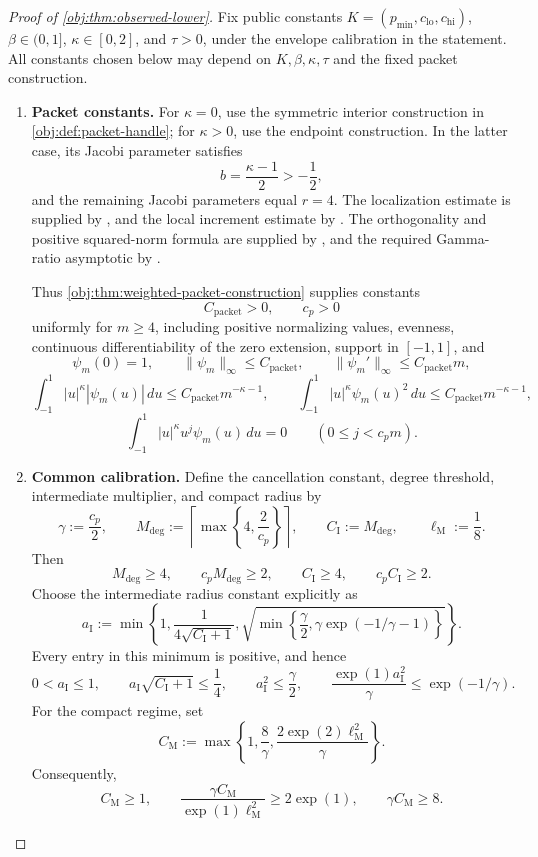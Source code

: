 \documentclass[11pt]{article}
\begin{document}
\begin{proof}[Proof of \cref{obj:thm:observed-lower}]
Fix public constants \(K=(p_{\min},c_{\mathrm{lo}},c_{\mathrm{hi}})\), \(\beta\in(0,1]\), \(\kappa\in[0,2]\), and \(\tau>0\), under the envelope calibration in the statement. All constants chosen below may depend on \(K,\beta,\kappa,\tau\) and the fixed packet construction.

\begin{enumerate}
\item \textbf{Packet constants.}
For \(\kappa=0\), use the symmetric interior construction in \cref{obj:def:packet-handle}; for \(\kappa>0\), use the endpoint construction. In the latter case, its Jacobi parameter satisfies
\[
b=\frac{\kappa-1}{2}>-\frac12,
\]
and the remaining Jacobi parameters equal \(r=4\). The localization estimate is supplied by \citep[Theorem 2.4, equation (2.14)]{PetrushevXu2005}, and the local increment estimate by \citep[Theorem 2.2, equation (2.4)]{https://people.math.sc.edu/pencho/Publications/kpx-06-28-06-web.pdf}. The orthogonality and positive squared-norm formula are supplied by \citep[Table 18.3.1, Jacobi row and caption]{https://dlmf.nist.gov/18.3}, and the required Gamma-ratio asymptotic by \citep[equation (5.11.12), restricted to the positive real axis]{https://dlmf.nist.gov/5.11.E12}.

Thus \cref{obj:thm:weighted-packet-construction} supplies constants
\[
C_{\mathrm{packet}}>0,\qquad c_p>0
\]
uniformly for \(m\ge4\), including positive normalizing values, evenness, continuous differentiability of the zero extension, support in \([-1,1]\), and
\[
\psi_m(0)=1,\qquad
\|\psi_m\|_\infty\le C_{\mathrm{packet}},\qquad
\|\psi_m'\|_\infty\le C_{\mathrm{packet}}m,
\]
\[
\int_{-1}^{1}|u|^\kappa|\psi_m(u)|\,du
\le C_{\mathrm{packet}}m^{-\kappa-1},
\qquad
\int_{-1}^{1}|u|^\kappa\psi_m(u)^2\,du
\le C_{\mathrm{packet}}m^{-\kappa-1},
\]
\[
\int_{-1}^{1}|u|^\kappa u^j\psi_m(u)\,du=0
\qquad(0\le j<c_pm).
\]

\item \textbf{Common calibration.}
Define the cancellation constant, degree threshold, intermediate multiplier, and compact radius by
\[
\gamma:=\frac{c_p}{2},\qquad
M_{\mathrm{deg}}:=\left\lceil\max\left\{4,\frac{2}{c_p}\right\}\right\rceil,
\qquad
C_{\mathrm I}:=M_{\mathrm{deg}},\qquad
\ell_{\mathrm M}:=\frac18.
\]
Then
\[
M_{\mathrm{deg}}\ge4,\qquad
c_pM_{\mathrm{deg}}\ge2,\qquad
C_{\mathrm I}\ge4,\qquad c_pC_{\mathrm I}\ge2.
\]
Choose the intermediate radius constant explicitly as
\[
a_{\mathrm I}:=
\min\left\{
1,\frac{1}{4\sqrt{C_{\mathrm I}+1}},
\sqrt{\min\left\{\frac{\gamma}{2},
\gamma\exp(-1/\gamma-1)\right\}}
\right\}.
\]
Every entry in this minimum is positive, and hence
\[
0<a_{\mathrm I}\le1,\qquad
a_{\mathrm I}\sqrt{C_{\mathrm I}+1}\le\frac14,\qquad
a_{\mathrm I}^2\le\frac{\gamma}{2},\qquad
\frac{\exp(1)a_{\mathrm I}^2}{\gamma}\le\exp(-1/\gamma).
\]
For the compact regime, set
\[
C_{\mathrm M}:=
\max\left\{
1,\frac8\gamma,\frac{2\exp(2)\ell_{\mathrm M}^2}{\gamma}
\right\}.
\]
Consequently,
\[
C_{\mathrm M}\ge1,\qquad
\frac{\gamma C_{\mathrm M}}{\exp(1)\ell_{\mathrm M}^2}
\ge2\exp(1),\qquad
\gamma C_{\mathrm M}\ge8.
\]


\end{enumerate}
\end{proof}
\end{document}

